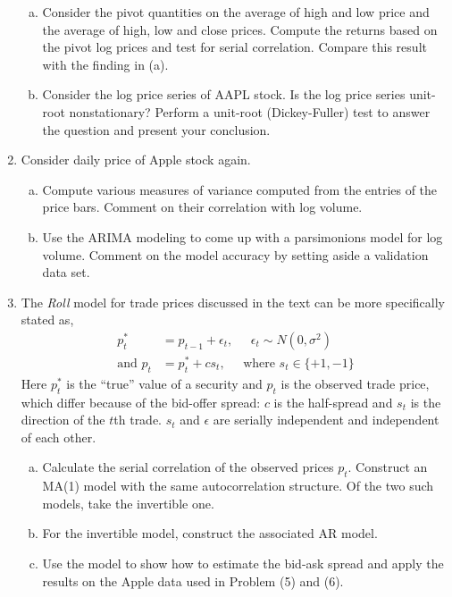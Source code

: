 \begin{enumerate}[1.]
\begin{enumerate}[(a)]
\item Consider the pivot quantities on the average of high and low price and the average of high, low and close prices. Compute the returns based on the pivot log prices and test for serial correlation. Compare this result with the finding in (a). 

\item Consider the log price series of AAPL stock. Is the log price series unit-root nonstationary? Perform a unit-root (Dickey-Fuller) test to answer the question and present your conclusion.
\end{enumerate}

\item Consider daily price of Apple stock again.
\begin{enumerate}[(a)]
\item Compute various measures of variance computed from the entries of the price bars. Comment on their correlation with log volume. 

\item Use the ARIMA modeling to come up with a parsimonions model for log volume. Comment on the model accuracy by setting aside a validation data set. 
\end{enumerate}


\item The \textit{Roll} model for trade prices discussed in the text can be more specifically stated as,
	\[
	\begin{split}
	p_t^*&= p_{t-1} + \epsilon_t, \;\;\;\;\; \epsilon_t \sim N(0,\sigma^2) \\
	\text{and } p_t&= p_t^* + c s_t, \;\;\;\;\; \text{where }s_t \in \{+1,-1\}
	\end{split}
	\]
Here $p_t^*$ is the ``true'' value of a security and $p_t$ is the observed trade price, which differ because of the bid-offer spread: $c$ is the half-spread and $s_t$ is the direction of the $t$th trade. $s_t$ and $\epsilon$ are serially independent and independent of each other.
\begin{enumerate}[(a)]
\item Calculate the serial correlation of the observed prices $p_t$. Construct an MA(1) model with the same autocorrelation structure. Of the two such models, take the invertible one. 

\item For the invertible model, construct the associated AR model. 

\item Use the model to show how to estimate the bid-ask spread and apply the results on the Apple data used in Problem (5) and (6). \\
\end{enumerate}



\end{enumerate}